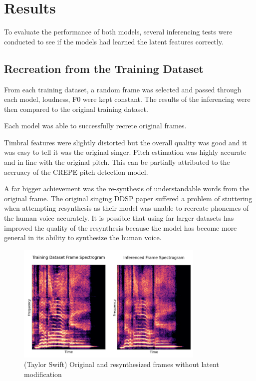 \section{Results}

To evaluate the performance of both models, several inferencing tests were conducted to see if the models had learned the latent features correctly.

\subsection{Recreation from the Training Dataset}

From each training dataset, a random frame was selected and passed through each model, loudness, F0 were kept constant. The results of the inferencing were then compared to the original training dataset.

Each model was able to successfully recrete original frames.

Timbral features were slightly distorted but the overall quality was good and it was easy to tell it was the original singer. Pitch estimation was highly accurate and in line with the original pitch. This can be partially attributed to the accruacy of the CREPE pitch detection model\cite{CREPE}.

A far bigger achievement was the re-synthesis of understandable words from the original frame. The original singing DDSP paper\cite{SingingDDSP} suffered a problem of stuttering when attempting resynthesis as their model was unable to recreate phonemes of the human voice accurately. It is possible that using far larger datasets has improved the quality of the resynthesis because the model has become more general in its ability to synthesize the human voice.

\begin{figure}
    \centering
    \includegraphics[width=0.8\textwidth]{research/results/TaylorSwift/InferredRecreation.png}
    \caption{(Taylor Swift) Original and resynthesized frames without latent modification}
\end{figure}

